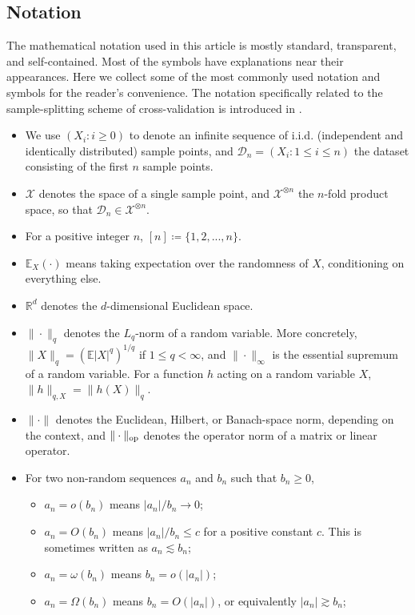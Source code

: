 \documentclass[11pt]{article}
\theoremstyle{plain}
\newcommand{\D}{{\mathcal{D}}}
\begin{document}
\subsection{Notation}
The mathematical notation used in this article is mostly standard, transparent, and self-contained.  Most of the symbols have explanations near their appearances.   Here we collect some of the most commonly used notation and symbols for the reader's convenience. The notation specifically related to the sample-splitting scheme of cross-validation is introduced in .
\begin{itemize}
\item We use $(X_i:i\ge 0)$ to denote an infinite sequence of i.i.d. (independent and identically distributed) sample points, and $\D_n=(X_i:1\le i\le n)$ the dataset consisting of the first $n$ sample points.  
\item $\mathcal X$ denotes the space of a single sample point, and $\mathcal X^{\otimes n}$ the $n$-fold product space, so that $\D_n\in \mathcal X^{\otimes n}$.
\item For a positive integer $n$, $[n]\coloneqq \{1,2,...,n\}$.
    \item $\mathbb E_X(\cdot)$ means taking expectation over the randomness of $X$, conditioning on everything else.
    \item $\mathbb R^d$ denotes the $d$-dimensional Euclidean space. 
    \item $\|\cdot\|_q$ denotes the $L_q$-norm of a random variable. More concretely, $\|X\|_q=(\mathbb E|X|^q)^{1/q}$ if $1\le q<\infty$, and $\|\cdot\|_\infty$ is the essential supremum of a random variable.  For a function $h$ acting on a random variable $X$, $\|h\|_{q,X}=\|h(X)\|_q$.
    \item $\|\cdot\|$ denotes the Euclidean, Hilbert, or Banach-space norm, depending on the context, and $\|\cdot\|_{\rm op}$ denotes the operator norm of a matrix or linear operator.
    \item For two non-random sequences $a_n$ and $b_n$ such that $b_n\ge 0$,
    \begin{itemize}
        \item   $a_n=o(b_n)$ means $|a_n|/b_n\rightarrow 0$;
        \item $a_n=O(b_n)$ means $|a_n|/b_n\le c$ for a positive constant $c$. This is sometimes written as $a_n\lesssim b_n$;
        \item $a_n=\omega(b_n)$ means $b_n=o(|a_n|)$;
        \item $a_n=\Omega(b_n)$ means $b_n=O(|a_n|)$, or equivalently $|a_n|\gtrsim b_n$;

\end{itemize}
\end{itemize}
\end{document}
